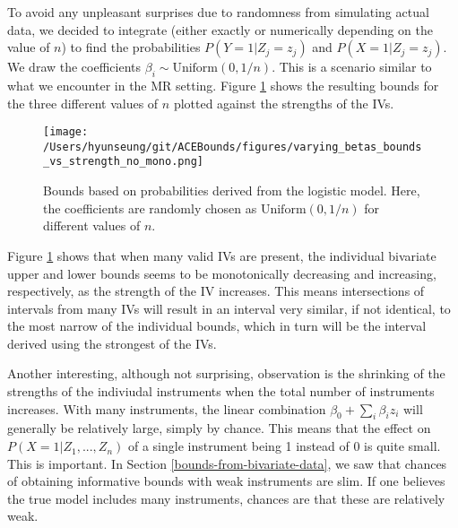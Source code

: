 \documentclass[
]{article}
\theoremstyle{plain}
\begin{document}
To avoid any unpleasant surprises due to randomness from simulating actual data, we decided to integrate (either exactly or numerically depending on the value of \(n\)) to find the probabilities \(P(Y = 1 | Z_j = z_j)\) and \(P(X = 1 | Z_j = z_j)\). We draw the coefficients \(\beta_i \sim \text{Uniform}(0, 1/n)\). This is a scenario similar to what we encounter in the MR setting. Figure \ref{fig:bounds_vs_strength_many_IVs_varying_betas} shows the resulting bounds for the three different values of \(n\) plotted against the strengths of the IVs.

\begin{figure}[H]
  \center
  \texttt{[image: /Users/hyunseung/git/ACEBounds/figures/varying\_betas\_bounds\_vs\_strength\_no\_mono.png]}
  \caption{Bounds based on probabilities derived from the logistic model. Here, the coefficients are randomly chosen as $\text{Uniform}(0, 1/n)$ for different values of $n$.}  
  \label{fig:bounds_vs_strength_many_IVs_varying_betas}
\end{figure}

Figure \ref{fig:bounds_vs_strength_many_IVs_varying_betas} shows that when many valid IVs are present, the individual bivariate upper and lower bounds seems to be monotonically decreasing and increasing, respectively, as the strength of the IV increases. This means intersections of intervals from many IVs will result in an interval very similar, if not identical, to the most narrow of the individual bounds, which in turn will be the interval derived using the strongest of the IVs.

Another interesting, although not surprising, observation is the shrinking of the strengths of the indiviudal instruments when the total number of instruments increases. With many instruments, the linear combination \(\beta_0 + \sum_i \beta_i z_i\) will generally be relatively large, simply by chance. This means that the effect on \(P(X = 1 | Z_1, ..., Z_n)\) of a single instrument being 1 instead of 0 is quite small. This is important. In Section \ref{bounds-from-bivariate-data}, we saw that chances of obtaining informative bounds with weak instruments are slim. If one believes the true model includes many instruments, chances are that these are relatively weak.
\end{document}
